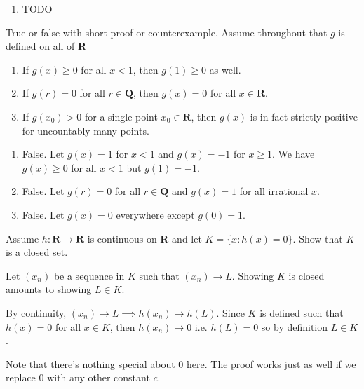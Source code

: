 \documentclass{oxmathproblems}
\begin{document}
\begin{questions}
\begin{solution}
\begin{enumerate}[label=(\alph*)]
    \item TODO
  \end{enumerate}
\end{solution}

\miquestion True or false with short proof or counterexample. Assume throughout that $g$ is defined on all of \textbf{R}
\begin{enumerate}[label=(\alph*)]
  \item If $g(x) \geq 0$ for all $x < 1$, then $g(1) \geq 0$ as well.
  \item If $g(r) = 0$ for all $r \in \textbf{Q}$, then $g(x)=0$ for all $x \in \textbf{R}$.
  \item If $g(x_{0}) > 0$ for a single point $x_{0} \in \textbf{R}$, then $g(x)$ is in fact strictly positive for uncountably many points.
\end{enumerate}

\begin{solution}
  \begin{enumerate}[label=(\alph*)]
    \item False. Let $g(x)=1$ for $x < 1$ and $g(x) = -1$ for $x \geq 1$. We have $g(x) \geq 0$ for all $x < 1$ but $g(1) = -1$.
    \item False. Let $g(r) = 0$ for all $r \in \textbf{Q}$ and $g(x) = 1$ for all irrational $x$.
    \item False. Let $g(x) = 0$ everywhere except $g(0)=1$.
  \end{enumerate}
\end{solution}

\miquestion Assume $h : \textbf{R} \to \textbf{R}$ is continuous on \textbf{R} and let $K = \{x : h(x)=0\}$. Show that $K$ is a closed set.
\begin{solution}
  Let $(x_{n})$ be a sequence in $K$ such that $(x_{n}) \to L$. Showing $K$ is closed amounts to showing $L \in K$.
  
  By continuity, $(x_{n}) \to L \implies h(x_{n}) \to h(L)$. Since $K$ is defined such that $h(x)=0$ for all $x \in K$, then $h(x_{n}) \to 0$ i.e. $h(L)=0$ so by definition $L \in K$.

  Note that there's nothing special about 0 here. The proof works just as well if we replace 0 with any other constant $c$.
\end{solution}


\end{questions}
\end{document}
